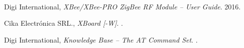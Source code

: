 \documentclass[11pt,oneside,spanish,a4paper]{article}
\begin{document}
\begin{thebibliography}{1}
  Digi International,
  \emph{XBee\textsuperscript{\textregistered{}}/XBee-PRO
    ZigBee\textsuperscript{\textregistered{}} RF Module -- User
    Guide}. 2016.
  
  Cika Electrónica SRL.,
  \emph{XBoard [-W]}.
  .

  Digi International,
  \emph{Knowledge Base -- The AT Command Set}.
  .

\end{thebibliography}



% 

% 


% 
\end{document}
